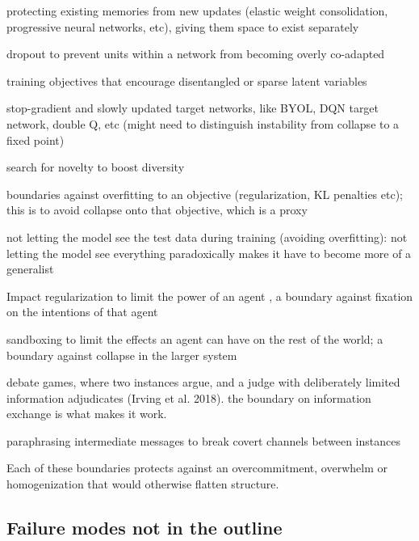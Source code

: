 protecting existing memories from new updates (elastic weight consolidation, progressive neural networks, etc), giving them space to exist separately

dropout to prevent units within a network from becoming overly co-adapted \citep{srivastava2014dropout}

training objectives that encourage disentangled or sparse latent variables \citep{higgins2017betavae, cunningham2024sparse}

stop-gradient and slowly updated target networks, like BYOL, DQN target network, double Q, etc (might need to distinguish instability from collapse to a fixed point)

search for novelty to boost diversity \citep{lehman2011abandoning}

boundaries against overfitting to an objective (regularization, KL penalties etc); this is to avoid collapse onto that objective, which is a proxy

not letting the model see the test data during training (avoiding overfitting): not letting the model see everything paradoxically makes it have to become more of a generalist

Impact regularization to limit the power of an agent \citep{krakovna2018penalizing}, a boundary against fixation on the intentions of that agent

sandboxing to limit the effects an agent can have on the rest of the world; a boundary against collapse in the larger system

debate games, where two instances argue, and a judge with deliberately limited information adjudicates (Irving et al. 2018). the boundary on information exchange is what makes it work.

paraphrasing intermediate messages to break covert channels between instances

Each of these boundaries protects against an overcommitment, overwhelm or homogenization that would otherwise flatten structure.


\subsection{Failure modes not in the outline}

